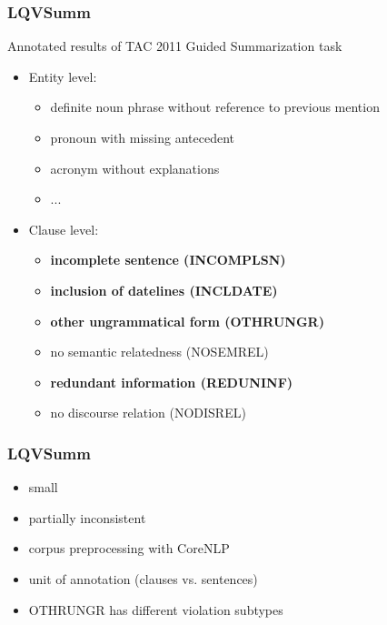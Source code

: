 \documentclass[table]{beamer}
\begin{document}
\begin{frame}
  \frametitle{LQVSumm \citep{friedrichlqvsumm}}
  Annotated results of TAC 2011 Guided Summarization task \citep{owczarzak2011overview}
\pause
  \begin{itemize}
    \item Entity level:
    \begin{itemize}
      \item definite noun phrase without reference to previous mention%
      \item pronoun with missing antecedent%
      \item acronym without explanations%
      \item ...
    \end{itemize}\pause
    \item Clause level:
    \begin{itemize}
      \item \textbf{incomplete sentence (INCOMPLSN)}
      \item \textbf{inclusion of datelines (INCLDATE)}
      \item \textbf{other ungrammatical form (OTHRUNGR)}
      \item no semantic relatedness (NOSEMREL)
      \item \textbf{redundant information (REDUNINF)}
      \item no discourse relation (NODISREL)
    \end{itemize}
  \end{itemize}
\end{frame}

\begin{frame}
  \frametitle{LQVSumm \citep{friedrichlqvsumm}}
  \begin{itemize}
    \item small %
    \item partially inconsistent\pause %
    \item corpus preprocessing with CoreNLP \citep{manning-EtAl:2014:P14-5}
    \item unit of annotation (clauses vs. sentences)\pause
    \item OTHRUNGR has different violation subtypes
  \end{itemize}
\end{frame}
\end{document}
